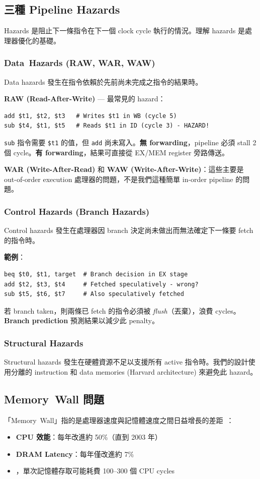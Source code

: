 \documentclass[journal]{IEEEtran}
\newcommand{\tagit}[1]{\textit{#1}}
\newcommand{\ResultTag}{\tagit{結果：}}
\begin{document}
\subsection{三種 Pipeline Hazards}
Hazards 是阻止下一條指令在下一個 clock cycle 執行的情況。理解 hazards 是處理器優化的基礎。

\subsubsection{Data~Hazards (RAW, WAR, WAW)}
Data hazards 發生在指令依賴於先前尚未完成之指令的結果時。

\textbf{RAW (Read-After-Write)} --- 最常見的 hazard：
\begin{lstlisting}
add $t1, $t2, $t3   # Writes $t1 in WB (cycle 5)
sub $t4, $t1, $t5   # Reads $t1 in ID (cycle 3) - HAZARD!
\end{lstlisting}
\texttt{sub} 指令需要 \texttt{\$t1} 的值，但 \texttt{add} 尚未寫入。\textbf{無 forwarding}，pipeline 必須 stall 2 個 cycle。\textbf{有 forwarding}，結果可直接從 EX/MEM register 旁路傳送。

\textbf{WAR (Write-After-Read)} 和 \textbf{WAW (Write-After-Write)}：這些主要是 out-of-order execution 處理器的問題，不是我們這種簡單 in-order pipeline 的問題。

\subsubsection{Control Hazards (Branch Hazards)}
Control hazards 發生在處理器因 branch 決定尚未做出而無法確定下一條要 fetch 的指令時。

\textbf{範例}：
\begin{lstlisting}
beq $t0, $t1, target  # Branch decision in EX stage
add $t2, $t3, $t4     # Fetched speculatively - wrong?
sub $t5, $t6, $t7     # Also speculatively fetched
\end{lstlisting}
若 branch taken，則兩條已 fetch 的指令必須被 \textit{flush}（丟棄），浪費 cycles。\textbf{Branch prediction} 預測結果以減少此 penalty。

\subsubsection{Structural Hazards}
Structural hazards 發生在硬體資源不足以支援所有 active 指令時。我們的設計使用分離的 instruction 和 data memories (Harvard architecture) 來避免此 hazard。

\subsection{Memory~Wall 問題}
「Memory~Wall」指的是處理器速度與記憶體速度之間日益增長的差距~\cite{hennessy2017computer}：
\begin{itemize}
    \item \textbf{CPU 效能}：每年改進約 50\%（直到 2003 年）
    \item \textbf{DRAM Latency}：每年僅改進約 7\%
    \item {}，單次記憶體存取可能耗費 100--300 個 CPU cycles
\end{itemize}
\end{document}
